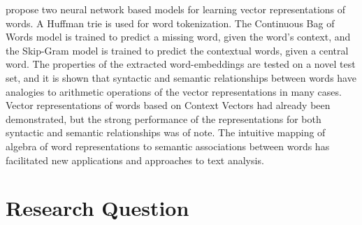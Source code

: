 \documentclass[sigconf, nonacm]{acmart}
\begin{document}
\citet{mikolov-2013} propose two neural network based models for learning vector representations of words. A Huffman trie is used for word tokenization. The Continuous Bag of Words model is trained to predict a missing word, given the word's context, and the Skip-Gram model is trained to predict the contextual words, given a central word. The properties of the extracted word-embeddings are tested on a novel test set, and it is shown that syntactic and semantic relationships between words have analogies to arithmetic operations of the vector representations in many cases. Vector representations of words based on Context Vectors had already been demonstrated, but the strong performance of the representations for both syntactic and semantic relationships was of note. The intuitive mapping of algebra of word representations to semantic associations between words has facilitated new applications and approaches to text analysis.



\section{Research Question}
\end{document}

